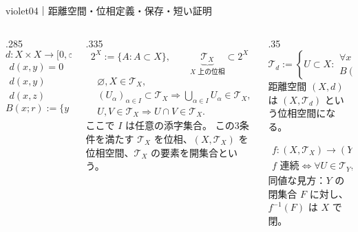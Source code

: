 \begin{sheetframe}[50]{violet}{04｜距離空間・位相}{定義・保存・短い証明}

\begin{columns}[T,onlytextwidth]
\begin{column}{.285\textwidth}
\[
d:X\times X\longrightarrow[0,\infty),\qquad
x,y,z\in X
\]
\[
\begin{aligned}
d(x,y)=0&\iff x=y,\\
d(x,y)&=d(y,x),\\
d(x,z)&\le d(x,y)+d(y,z).
\end{aligned}
\]
\[
\boxed{B(x;r):=\{y\in X:d(x,y)<r\}\quad(r>0)}
\]
\end{column}

\begin{column}{.335\textwidth}
\[
2^X:=\{A:A\subset X\},\qquad
\underbrace{\mathcal T_X}_{X\text{ 上の位相}}\subset 2^X
\]
\[
\begin{aligned}
&\varnothing,X\in\mathcal T_X,\\
&(U_\alpha)_{\alpha\in I}\subset\mathcal T_X
 \Rightarrow \bigcup_{\alpha\in I}U_\alpha\in\mathcal T_X,\\
&U,V\in\mathcal T_X
 \Rightarrow U\cap V\in\mathcal T_X.
\end{aligned}
\]
ここで $I$ は任意の添字集合。
この3条件を満たす $\mathcal T_X$ を位相、$(X,\mathcal T_X)$ を位相空間、$\mathcal T_X$ の要素を開集合という。
\end{column}

\begin{column}{.35\textwidth}
\[
\mathcal T_d
:=\left\{U\subset X:
\begin{array}{l}
\forall x\in U,\ \exists r>0,\\[-.5mm]
B(x;r)\subset U
\end{array}\right\}.
\]
距離空間 $(X,d)$ は $(X,\mathcal T_d)$ という位相空間になる。
\begin{center}
\end{center}
\[
\boxed{
\begin{gathered}
f:(X,\mathcal T_X)\to(Y,\mathcal T_Y),\\
f\text{ 連続}
\iff
\forall U\in\mathcal T_Y,\ f^{-1}(U)\in\mathcal T_X.
\end{gathered}}
\]
同値な見方：$Y$ の閉集合 $F$ に対し、$f^{-1}(F)$ は $X$ で閉。
\end{column}
\end{columns}


\end{sheetframe}
